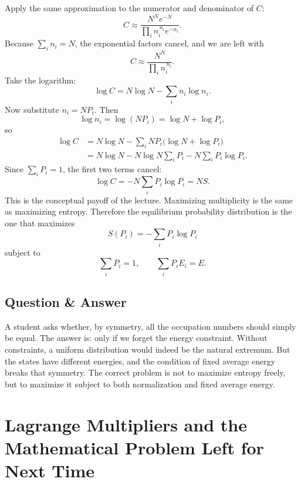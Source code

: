 Apply the same approximation to the numerator and denominator of \(C\):
\begin{equation}
C
\approx
\frac{N^N e^{-N}}{\prod_i n_i^{\,n_i} e^{-n_i}}.
\end{equation}
Because \(\sum_i n_i=N\), the exponential factors cancel, and we are left with
\begin{equation}
C\approx \frac{N^N}{\prod_i n_i^{\,n_i}}.
\end{equation}
Take the logarithm:
\begin{equation}
\log C = N\log N-\sum_i n_i\log n_i.
\end{equation}
Now substitute \(n_i=NP_i\). Then
\begin{equation}
\log n_i = \log(NP_i)=\log N+\log P_i,
\end{equation}
so
\begin{align}
\log C
&= N\log N-\sum_i NP_i\bigl(\log N+\log P_i\bigr) \\
&= N\log N - N\log N\sum_i P_i - N\sum_i P_i\log P_i.
\end{align}
Since \(\sum_i P_i=1\), the first two terms cancel:
\begin{equation}
\log C = -N\sum_i P_i\log P_i = NS.
\end{equation}
This is the conceptual payoff of the lecture. Maximizing multiplicity is the same as maximizing entropy. Therefore the equilibrium probability distribution is the one that maximizes
\begin{equation}
S(P_i)=-\sum_i P_i\log P_i
\end{equation}
subject to
\begin{equation}
\sum_i P_i=1,
\qquad
\sum_i P_iE_i=E.
\end{equation}

\subsection{Question \& Answer}

A student asks whether, by symmetry, all the occupation numbers should simply be equal. The answer is: only if we forget the energy constraint. Without constraints, a uniform distribution would indeed be the natural extremum. But the states have different energies, and the condition of fixed average energy breaks that symmetry. The correct problem is not to maximize entropy freely, but to maximize it subject to both normalization and fixed average energy.

\section{Lagrange Multipliers and the Mathematical Problem Left for Next Time}

